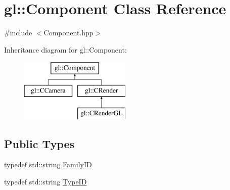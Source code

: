 \hypertarget{classgl_1_1_component}{\section{gl\-:\-:Component Class Reference}
\label{classgl_1_1_component}
}


{\ttfamily \#include $<$Component.\-hpp$>$}

Inheritance diagram for gl\-:\-:Component\-:\begin{figure}[H]
\begin{center}
\leavevmode
\includegraphics[height=3.000000cm]{classgl_1_1_component}
\end{center}
\end{figure}
\subsection*{Public Types}
\begin{DoxyCompactItemize}
\item 
typedef std\-::string \hyperlink{classgl_1_1_component_a55fcc946bfc525917e6380e5b71a3f49}{Family\-I\-D}
\item 
typedef std\-::string \hyperlink{classgl_1_1_component_a2dae94eddffdba218f51d19dd9d66e4e}{Type\-I\-D}
\end{DoxyCompactItemize}
